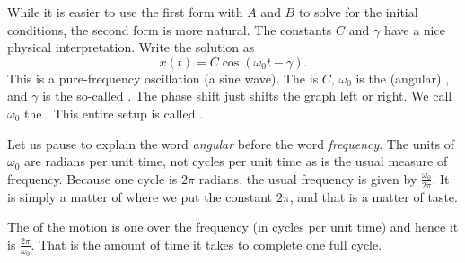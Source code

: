 While it is easier to use the first form with $A$ and $B$
to solve for the initial conditions, the second form is more natural.
The constants $C$ and $\gamma$ have a nice physical interpretation.
Write the solution as
\begin{equation*}
x(t) = C \cos ( \omega_0 t - \gamma ) .
\end{equation*}
This is a pure-frequency oscillation (a sine wave).
The \emph{} is $C$, $\omega_0$ is the (angular)
\emph{},
and $\gamma$ is the so-called \emph{}.
The phase shift just shifts the
graph left or right.
We call $\omega_0$ the \emph{}.
This entire setup is 
called \emph{}.

Let us pause to explain the word \emph{angular}
before the word \emph{frequency}.
The units of
$\omega_0$ are radians per unit time, not cycles per unit time 
as is the usual measure of frequency.  Because one cycle is $2
\pi$ radians, the usual frequency is given by $\frac{\omega_0}{2\pi}$.
It is simply a matter of where we put the constant $2\pi$, and that is a
matter of taste.

The \emph{} of the motion is one over the frequency (in cycles per unit
time) and hence it is $\frac{2\pi}{\omega_0}$.  That is the amount of time it takes
to complete one full cycle.


